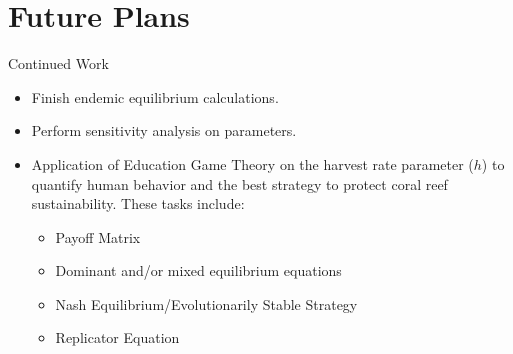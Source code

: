 \documentclass{beamer}
\begin{document}



\section{Future Plans}
\begin{frame}{Continued Work}
    \begin{itemize}
        \item Finish endemic equilibrium calculations.
        \item Perform sensitivity analysis on parameters.
        \item Application of Education Game Theory on the harvest rate parameter ($h$) to quantify human behavior and the best strategy to protect coral reef sustainability. These tasks include:
        \begin{itemize}
            \item Payoff Matrix
            \item Dominant and/or mixed equilibrium equations
            \item Nash Equilibrium/Evolutionarily Stable Strategy
            \item Replicator Equation
        \end{itemize}
    \end{itemize}
\end{frame}
\end{document}

